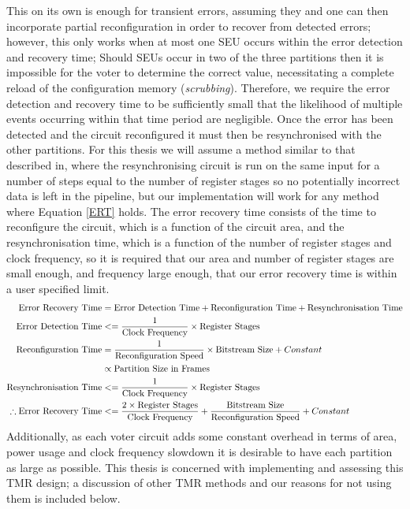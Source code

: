 \documentclass[12pt,final,oneside]{memoir} %
\begin{document}
 
 This on its own is enough for transient errors, assuming they and one can then incorporate partial reconfiguration in order to recover from detected errors; however, this only works when at most one \ac{SEU} occurs within the error detection and recovery time; Should \acp{SEU} occur in two of the three partitions then it is impossible for the voter to determine the correct value, necessitating a complete reload of the configuration memory (\emph{scrubbing}). Therefore, we require the error detection and recovery time to be sufficiently small that the likelihood of multiple events occurring within that time period are negligible.
Once the error has been detected and the circuit reconfigured it must then be resynchronised with the other partitions. For this thesis we will assume a method similar to that described in\cite{DiesselChange}, where the resynchronising circuit is run on the same input for a number of steps equal to the number of register stages so no potentially incorrect data is left in the pipeline, but our implementation will work for any method where Equation \ref{ERT} holds.
The error recovery time consists of the time to reconfigure the circuit, which is a function of the circuit area, and the resynchronisation time, which is a function of the number of register stages and clock frequency, so it is required that our area and number of register stages are small enough, and frequency large enough, that our error recovery time is within a user specified limit.
\begin{align}
    \mbox{Error Recovery Time} &=\mbox{Error Detection Time} + \mbox{Reconfiguration Time} + \mbox{Resynchronisation Time}\notag\\
    \mbox{Error Detection Time} &<= \frac{1}{\mbox{Clock Frequency}}\times\mbox{Register Stages}\notag\\
    \mbox{Reconfiguration Time} &= \frac{1}{\mbox{Reconfiguration Speed}}\times\mbox{Bitstream Size}+Constant\notag\\
     &\propto \mbox{Partition Size in Frames}\notag\\
    \mbox{Resynchronisation Time} &<= \frac{1}{\mbox{Clock Frequency}}\times\mbox{Register Stages}\notag\\
    \therefore \mbox{Error Recovery Time} &<= \frac{2\times\mbox{Register Stages}}{\mbox{Clock Frequency}} + \frac{\mbox{Bitstream Size}}{\mbox{Reconfiguration Speed}}+Constant\label{ERT}
\end{align}\cite{DiesselChange}
Additionally, as each voter circuit adds some constant overhead in terms of area, power usage and clock frequency slowdown it is desirable to have each partition as large as possible. This thesis is concerned with implementing and assessing this \ac{TMR} design; a discussion of other \ac{TMR} methods and our reasons for not using them is included below.
\end{document}
